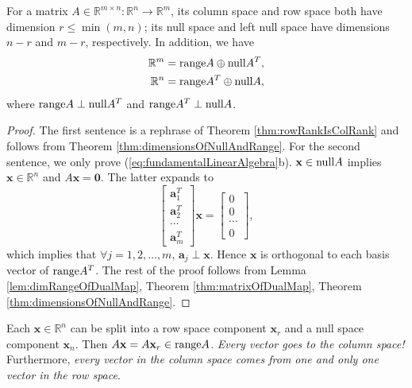 \begin{thm}
  \label{thm:fundamentalLinearAlgebra}
  For a matrix $A\in \mathbb{R}^{m\times n}:
  \mathbb{R}^n\rightarrow \mathbb{R}^m$,
  its column space and row space both have dimension
  $r\le \min(m,n)$;
  its null space and left null space
   have dimensions $n-r$ and $m-r$,
   respectively.
  In addition, we have
  \begin{subequations}
    \label{eq:fundamentalLinearAlgebra}
    \begin{align}
      \mathbb{R}^m &= \mathrm{range} A \oplus \mathrm{null} A^T,
      \\
      \mathbb{R}^n &= \mathrm{range} A^T \oplus \mathrm{null} A,
    \end{align}
  \end{subequations}
  where $\mathrm{range} A\perp \mathrm{null} A^T$ and
  $\mathrm{range} A^T \perp \mathrm{null} A$.
\end{thm}
\begin{proof}
  The first sentence is a rephrase of
   Theorem \ref{thm:rowRankIsColRank}
   and follows from Theorem \ref{thm:dimensionsOfNullAndRange}. 
  For the second sentence,
   we only prove (\ref{eq:fundamentalLinearAlgebra}b).
  $\mathbf{x}\in \mathrm{null} A$ implies
  $\mathbf{x}\in \mathbb{R}^n$
  and $A\mathbf{x}=\mathbf{0}$.
  The latter expands to
  \begin{displaymath}
    \begin{bmatrix}
      \mathbf{a}^T_1
      \\
      \mathbf{a}^T_2
      \\
      \cdots
      \\
      \mathbf{a}^T_m
    \end{bmatrix}
    \mathbf{x}
    =
    \begin{bmatrix}
      0
      \\
      0
      \\
      \cdots
      \\
      0
    \end{bmatrix},
  \end{displaymath}
  which implies that $\forall j=1,2,\ldots, m$,
  $\mathbf{a}_j \perp \mathbf{x}$.
  Hence
  $\mathbf{x}$ is orthogonal to each basis vector
  of $\mathrm{range} A^T$.
  The rest of the proof follows from
   Lemma \ref{lem:dimRangeOfDualMap},
   Theorem \ref{thm:matrixOfDualMap}, 
   Theorem \ref{thm:dimensionsOfNullAndRange}. 
\end{proof}

\begin{rem}
  Each $\mathbf{x}\in \mathbb{R}^n$
  can be split into a row space component $\mathbf{x}_r$
  and a null space component $\mathbf{x}_n$.
  Then $A \mathbf{x} = A \mathbf{x}_r \in \mathrm{range} A$.
  \emph{Every vector goes to the column space!}
  Furthermore,
  \emph{every vector in the column space
    comes from one and only one vector in the row space}.
\end{rem}


